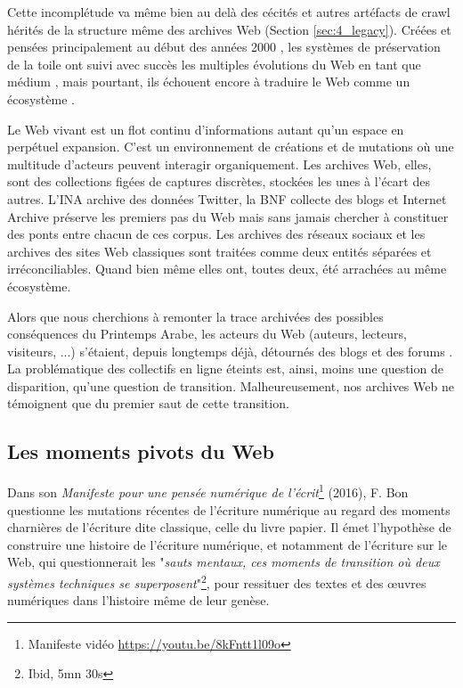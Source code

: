 \documentclass[symmetric,justified,marginals=raggedouter]{tufte-book}
\begin{document}
Cette incomplétude va même bien au delà des cécités et autres artéfacts de crawl hérités de la structure même des archives Web (Section \ref{sec:4_legacy}). Créées et pensées principalement au début des années 2000 \citep{masanes_web_2006}, les systèmes de préservation de la toile ont suivi avec succès les multiples évolutions du Web en tant que médium \citep{cho_evolution_1999,oita_archiving_2010,pop_archiving_2010}, mais pourtant, ils échouent encore à traduire le Web comme un écosystème \citep{brugger_website_2009}. 

Le Web vivant est un flot continu d'informations autant qu'un espace en perpétuel expansion. C'est un environnement de créations et de mutations où une multitude d'acteurs peuvent interagir organiquement. Les archives Web, elles, sont des collections figées de captures discrètes, stockées les unes à l'écart des autres. L'INA archive des données Twitter, la BNF collecte des blogs et Internet Archive préserve les premiers pas du Web mais sans jamais chercher à constituer des ponts entre chacun de ces corpus. Les archives des réseaux sociaux et les archives des sites Web classiques sont traitées comme deux entités séparées et irréconciliables. Quand bien même elles ont, toutes deux, été arrachées au même écosystème. 

Alors que nous cherchions à remonter la trace archivées des possibles conséquences du Printemps Arabe, les acteurs du Web (auteurs, lecteurs, visiteurs, ...) s'étaient, depuis longtemps déjà, détournés des blogs et des forums \citep{khondker_role_2011,lotan_arab_2011}. La problématique des collectifs en ligne éteints est, ainsi, moins une question de disparition, qu'une question de transition. Malheureusement, nos archives Web ne témoignent que du premier saut de cette transition.  

\subsection{Les moments pivots du Web}

\noindent Dans son \textit{Manifeste pour une pensée numérique de l'écrit}\footnote{Manifeste vidéo \url{https://youtu.be/8kFntt1l09o}} (2016), F. Bon questionne les mutations récentes de l'écriture numérique au regard des moments charnières de l'écriture dite classique, celle du livre papier. Il émet l'hypothèse de construire une histoire de l'écriture numé\-rique, et notamment de l'écriture sur le Web, qui questionnerait les "\textit{sauts mentaux, ces moments de transition où deux systèmes techniques se superposent}"\footnote{Ibid, 5mn 30s}, pour ressituer des textes et des œuvres numériques dans l'histoire même de leur genèse.
\end{document}
